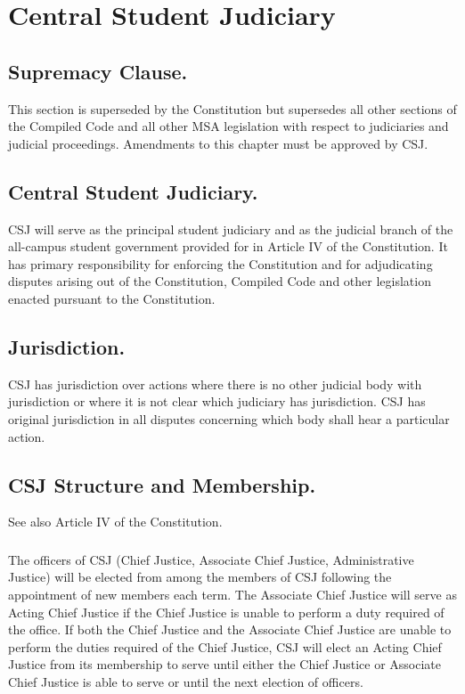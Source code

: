 
\section{Central Student Judiciary}

\subsection{Supremacy Clause.}
This section is superseded by the Constitution but supersedes all other sections of the Compiled Code and all other MSA legislation with respect to judiciaries and judicial proceedings.  Amendments to this chapter must be approved by CSJ.
\subsection{Central Student Judiciary.}
CSJ will serve as the principal student judiciary and as the judicial branch of the all-campus student government provided for in Article IV of the Constitution.  It has primary responsibility for enforcing the Constitution and for adjudicating disputes arising out of the Constitution, Compiled Code and other legislation enacted pursuant to the Constitution.
\subsection{Jurisdiction.}
CSJ has jurisdiction over actions where there is no other judicial body with jurisdiction or where it is not clear which judiciary has jurisdiction.  CSJ has original jurisdiction in all disputes concerning which body shall hear a particular action.

\subsection{CSJ Structure and Membership.}  See also Article IV of the Constitution.
\subsubsection{}
The officers of CSJ (Chief Justice, Associate Chief Justice, Administrative Justice) will be elected from among the members of CSJ following the appointment of new members each term.  The Associate Chief Justice will serve as Acting Chief Justice if the Chief Justice is unable to perform a duty required of the office.  If both the Chief Justice and the Associate Chief Justice are unable to perform the duties required of the Chief Justice, CSJ will elect an Acting Chief Justice from its membership to serve until either the Chief Justice or Associate Chief Justice is able to serve or until the next election of officers.
